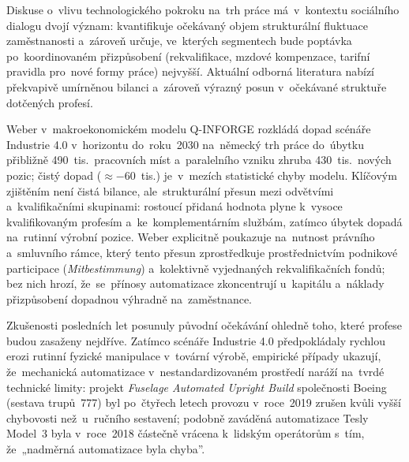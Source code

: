 
Diskuse o~vlivu technologického pokroku na~trh práce má~v~kontextu sociálního
dialogu dvojí význam: kvantifikuje očekávaný objem strukturální fluktuace
zaměstnanosti a~zároveň určuje, ve~kterých segmentech bude poptávka po~koordinovaném
přizpůsobení (rekvalifikace, mzdové kompenzace, tarifní pravidla pro~nové formy
práce) nejvyšší. Aktuální odborná literatura nabízí překvapivě umírněnou
bilanci a~zároveň výrazný posun v~očekávané struktuře dotčených
profesí.\par

Weber v~makroekonomickém modelu
Q-INFORGE rozkládá dopad scénáře Industrie 4.0 v~horizontu do~roku~2030 na~německý
trh práce do~úbytku přibližně 490~tis.\ pracovních míst a~paralelního vzniku
zhruba 430~tis.\ nových pozic; čistý dopad ($\approx{-60}$~tis.) je~v~mezích
statistické chyby modelu. Klíčovým zjištěním není čistá bilance, ale~strukturální
přesun mezi odvětvími a~kvalifikačními skupinami: rostoucí přidaná hodnota
plyne k~vysoce kvalifikovaným profesím a~ke~komplementárním službám, zatímco
úbytek dopadá na~rutinní výrobní pozice. Weber explicitně poukazuje
na~nutnost právního a~smluvního rámce, který tento přesun zprostředkuje
prostřednictvím podnikové participace (\emph{Mitbestimmung}) a~kolektivně
vyjednaných rekvalifikačních fondů; bez nich hrozí, že~se~přínosy automatizace
zkoncentrují u~kapitálu a~náklady přizpůsobení dopadnou výhradně na~zaměstnance.~\cite{Weber_Industrie40_2015}\par

Zkušenosti posledních let posunuly původní očekávání ohledně toho, které
profese budou zasaženy nejdříve. Zatímco scénáře Industrie 4.0
předpokládaly rychlou erozi rutinní fyzické manipulace v~tovární výrobě,
empirické případy ukazují, že~mechanická automatizace v~nestandardizovaném
prostředí naráží na~tvrdé technické limity: projekt \emph{Fuselage Automated
Upright Build} společnosti Boeing (sestava trupů~777) byl po~čtyřech letech
provozu v~roce~2019 zrušen kvůli vyšší chybovosti než~u~ručního sestavení;
podobně zaváděná automatizace Tesly Model~3 byla v~roce~2018 částečně vrácena
k~lidským operátorům s~tím, že~„nadměrná automatizace byla
chyba”.\par

